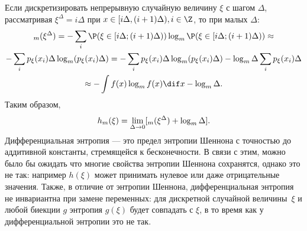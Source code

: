 \begin{remark}
	Если дискретизировать непрерывную случайную величину $\xi$ с шагом $\Delta$, рассматривая $\xi^{\Delta} = i\Delta$ при $x \in [i\Delta, (i+1)\Delta), i \in \Z$, то при малых $\Delta$:
	\begin{multline*}
		\H_m(\xi^{\Delta}) = -\sum_{i} \P(\xi \in [i\Delta; (i+1)\Delta))\log_m\P(\xi \in [i\Delta; (i+1)\Delta))  \approx \\
		-\sum_i p_{\xi}(x_i)\Delta \log_m(p_{\xi}(x_i)\Delta) =  -\sum_i p_{\xi}(x_i)\Delta \log_m(p_{\xi}(x_i)\Delta) - \log_m\Delta\sum_i p_{\xi}(x_i)\Delta \\\approx -\int f(x)\log_m f(x)\dif x - \log_m\Delta.
	\end{multline*}
	Таким образом,
	\[
		h_m(\xi) = \lim_{\Delta \to 0} [\relax_m(\xi^{\Delta}) + \log_m \Delta].
	\]
	Дифференциальная энтропия --- это предел энтропии Шеннона с точностью до аддитивной константы, стремящейся к бесконечности. В связи с этим, можно было бы ожидать что многие свойства энтропии Шеннона сохранятся, однако это не так: например $h(\xi)$ может принимать нулевое или даже отрицательные значения. Также, в отличие от энтропии Шеннона, дифференциальная энтропия не инвариантна при замене переменных: для дискретной случайной величины~$\xi$ и любой биекции $g$ энтропия $g(\xi)$ будет совпадать с $\xi$, в то время как у дифференциальной энтропии это не так.
\end{remark}

